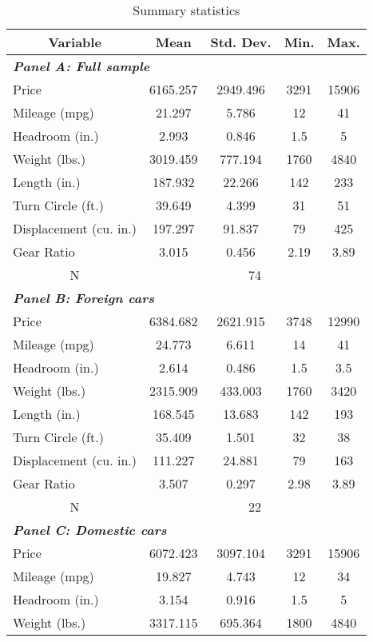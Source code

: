 \begin{table}[htbp]\centering \caption{Summary statistics \label{sumstat}}
\begin{tabular}{l c c c c }\hline\hline
\multicolumn{1}{c}{\textbf{Variable}} & \textbf{Mean}
& \textbf{Std. Dev.}& \textbf{Min.} &  \textbf{Max.} \\ \hline \multicolumn{5}{l}{\textbf{\textit{Panel A: Full sample}}} \\
Price & 6165.257 & 2949.496 & 3291 & 15906 \\
Mileage (mpg) & 21.297 & 5.786 & 12 & 41 \\
Headroom (in.) & 2.993 & 0.846 & 1.5 & 5 \\
Weight (lbs.) & 3019.459 & 777.194 & 1760 & 4840 \\
Length (in.) & 187.932 & 22.266 & 142 & 233 \\
Turn Circle (ft.) & 39.649 & 4.399 & 31 & 51 \\
Displacement (cu. in.) & 197.297 & 91.837 & 79 & 425 \\
Gear Ratio & 3.015 & 0.456 & 2.19 & 3.89 \\
\multicolumn{1}{c}{N} & \multicolumn{4}{c}{74}\\ \hline
\multicolumn{5}{l}{\textbf{\textit{Panel B: Foreign cars}}} \\
Price & 6384.682 & 2621.915 & 3748 & 12990 \\
Mileage (mpg) & 24.773 & 6.611 & 14 & 41 \\
Headroom (in.) & 2.614 & 0.486 & 1.5 & 3.5 \\
Weight (lbs.) & 2315.909 & 433.003 & 1760 & 3420 \\
Length (in.) & 168.545 & 13.683 & 142 & 193 \\
Turn Circle (ft.) & 35.409 & 1.501 & 32 & 38 \\
Displacement (cu. in.) & 111.227 & 24.881 & 79 & 163 \\
Gear Ratio & 3.507 & 0.297 & 2.98 & 3.89 \\
\multicolumn{1}{c}{N} & \multicolumn{4}{c}{22}\\ \hline
\multicolumn{5}{l}{\textbf{\textit{Panel C: Domestic cars}}} \\
Price & 6072.423 & 3097.104 & 3291 & 15906 \\
Mileage (mpg) & 19.827 & 4.743 & 12 & 34 \\
Headroom (in.) & 3.154 & 0.916 & 1.5 & 5 \\
Weight (lbs.) & 3317.115 & 695.364 & 1800 & 4840 \\

\end{tabular}
\end{table}
